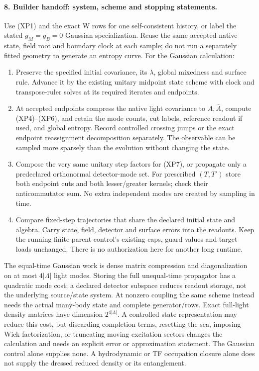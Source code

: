 \documentclass[11pt]{article}
\begin{document}
\paragraph{8. Builder handoff: system, scheme and stopping statements.}
Use (XP1) and the exact W rows for one self-consistent history,
or label the stated $g_M=g_B=0$ Gaussian specialization.
Reuse the same accepted native state, field root and boundary
clock at each sample; do not run a separately fitted geometry
to generate an entropy curve.
For the Gaussian calculation:
\begin{enumerate}
\item Preserve the specified initial covariance, its $\lambda$,
global mixedness and surface rule.  Advance it by the existing
unitary midpoint state scheme with clock and transpose-ruler
solves at its required iterates and endpoints.
\item At accepted endpoints compress the native light covariance
to $A,\bar A$, compute (XP4)--(XP6), and retain the mode counts,
cut labels, reference readout if used, and global entropy.
Record controlled crossing jumps or the exact endpoint
reassignment decomposition separately.  The observable can be sampled
more sparsely than the evolution without changing the state.
\item Compose the very same unitary step factors for (XP7),
or propagate only a predeclared orthonormal detector-mode set.
For prescribed $(T,T')$ store both endpoint cuts and both
lesser/greater kernels; check their anticommutator sum.
No extra independent modes are created by sampling in time.
\item Compare fixed-step trajectories that share the declared
initial state and algebra.  Carry state, field, detector and
surface errors into the readouts.  Keep the running finite-parent
control's existing caps, guard values and target loads unchanged.
There is no authorization here for another long runtime.
\end{enumerate}
The equal-time Gaussian work is dense matrix compression and
diagonalization on at most $4|\Lambda|$ light modes.  Storing
the full unequal-time propagator has a quadratic mode cost;
a declared detector subspace reduces readout storage, not the
underlying source/state system.
At nonzero coupling the same scheme instead needs the actual
many-body state and complete generator/rows.  Exact full-light
density matrices have dimension $2^{4|\Lambda|}$.
A controlled state representation may reduce this cost, but
discarding completion terms, resetting the sea, imposing Wick
factorization, or truncating moving excitation sectors changes
the calculation and needs an explicit error or approximation
statement.  The Gaussian control alone supplies none.
A hydrodynamic or TF occupation closure alone does not supply
the dressed reduced density or its entanglement.
\end{document}
